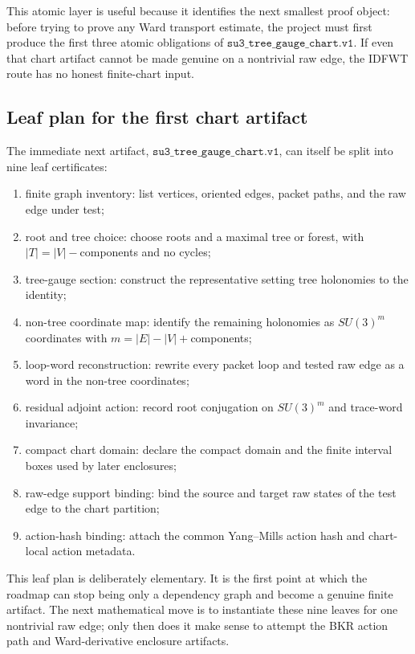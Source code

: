 This atomic layer is useful because it identifies the next smallest proof
object: before trying to prove any Ward transport estimate, the project must
first produce the first three atomic obligations of
\(\texttt{su3\_tree\_gauge\_chart.v1}\).  If even that chart artifact cannot
be made genuine on a nontrivial raw edge, the IDFWT route has no honest
finite-chart input.

\subsection{Leaf plan for the first chart artifact}
The immediate next artifact,
\(\texttt{su3\_tree\_gauge\_chart.v1}\), can itself be split into nine leaf
certificates:
\begin{enumerate}
\item finite graph inventory: list vertices, oriented edges, packet paths, and
  the raw edge under test;
\item root and tree choice: choose roots and a maximal tree or forest, with
  \(|T|=|V|-\)components and no cycles;
\item tree-gauge section: construct the representative setting tree holonomies
  to the identity;
\item non-tree coordinate map: identify the remaining holonomies as
  \(SU(3)^m\) coordinates with \(m=|E|-|V|+\)components;
\item loop-word reconstruction: rewrite every packet loop and tested raw edge
  as a word in the non-tree coordinates;
\item residual adjoint action: record root conjugation on \(SU(3)^m\) and
  trace-word invariance;
\item compact chart domain: declare the compact domain and the finite interval
  boxes used by later enclosures;
\item raw-edge support binding: bind the source and target raw states of the
  test edge to the chart partition;
\item action-hash binding: attach the common Yang--Mills action hash and
  chart-local action metadata.
\end{enumerate}
This leaf plan is deliberately elementary.  It is the first point at which the
roadmap can stop being only a dependency graph and become a genuine finite
artifact.  The next mathematical move is to instantiate these nine leaves for
one nontrivial raw edge; only then does it make sense to attempt the BKR
action path and Ward-derivative enclosure artifacts.

